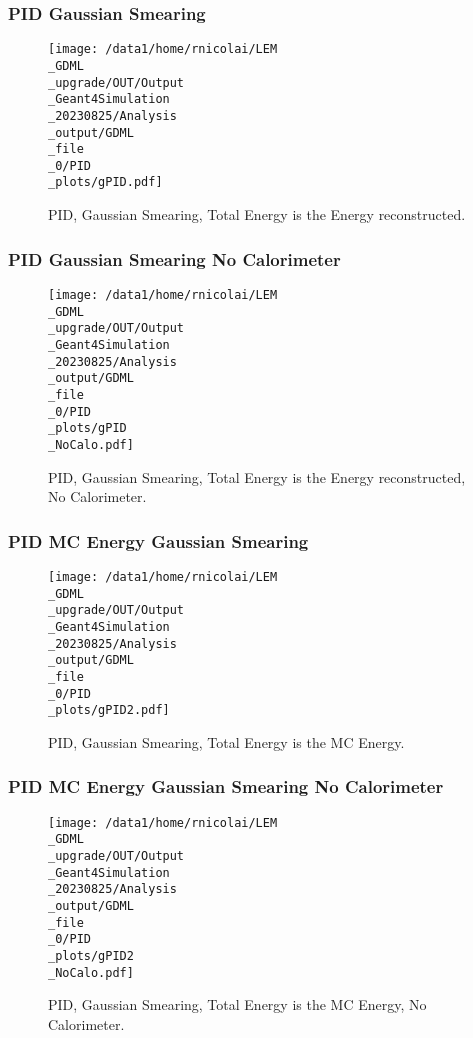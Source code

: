 \documentclass[8pt]{beamer}
\begin{document}
            \begin{frame}
                \frametitle{PID Gaussian Smearing}
            
        \begin{figure}[h]
            \centering
            \texttt{[image: /data1/home/rnicolai/LEM\\\_GDML\\\_upgrade/OUT/Output\\\_Geant4Simulation\\\_20230825/Analysis\\\_output/GDML\\\_file\\\_0/PID\\\_plots/gPID.pdf]}
            \caption{PID, Gaussian Smearing, Total Energy is the Energy reconstructed.}
        \end{figure}
        
            \end{frame}
            
            \begin{frame}
                \frametitle{PID Gaussian Smearing No Calorimeter}
            
        \begin{figure}[h]
            \centering
            \texttt{[image: /data1/home/rnicolai/LEM\\\_GDML\\\_upgrade/OUT/Output\\\_Geant4Simulation\\\_20230825/Analysis\\\_output/GDML\\\_file\\\_0/PID\\\_plots/gPID\\\_NoCalo.pdf]}
            \caption{PID, Gaussian Smearing, Total Energy is the Energy reconstructed, No Calorimeter.}
        \end{figure}
        
            \end{frame}
            
            \begin{frame}
                \frametitle{PID MC Energy Gaussian Smearing}
            
        \begin{figure}[h]
            \centering
            \texttt{[image: /data1/home/rnicolai/LEM\\\_GDML\\\_upgrade/OUT/Output\\\_Geant4Simulation\\\_20230825/Analysis\\\_output/GDML\\\_file\\\_0/PID\\\_plots/gPID2.pdf]}
            \caption{PID, Gaussian Smearing, Total Energy is the MC Energy.}
        \end{figure}
        
            \end{frame}
            
            \begin{frame}
                \frametitle{PID MC Energy Gaussian Smearing No Calorimeter}
            
        \begin{figure}[h]
            \centering
            \texttt{[image: /data1/home/rnicolai/LEM\\\_GDML\\\_upgrade/OUT/Output\\\_Geant4Simulation\\\_20230825/Analysis\\\_output/GDML\\\_file\\\_0/PID\\\_plots/gPID2\\\_NoCalo.pdf]}
            \caption{PID, Gaussian Smearing, Total Energy is the MC Energy, No Calorimeter.}
        \end{figure}
        
            \end{frame}
            
\end{document}
